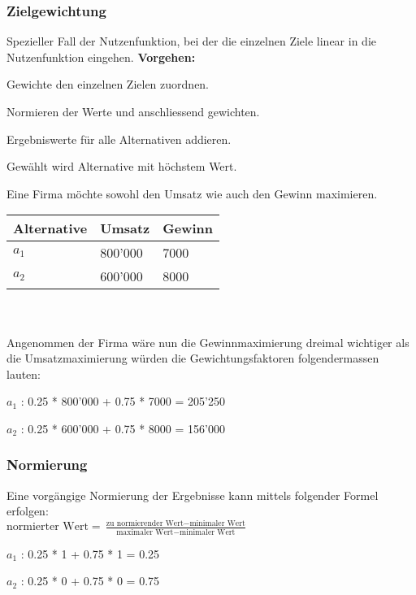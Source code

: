 \subsubsection{Zielgewichtung}
Spezieller Fall der Nutzenfunktion, bei der die einzelnen Ziele linear in die Nutzenfunktion eingehen.
\textbf{Vorgehen:} 
\begin{compactenum}
	\item Gewichte den einzelnen Zielen zuordnen.
	\item Normieren der Werte und anschliessend gewichten.
	\item Ergebniswerte für alle Alternativen addieren.
	\item Gewählt wird Alternative mit höchstem Wert.
\end{compactenum}
\begin{example}
	Eine Firma möchte sowohl den Umsatz	wie auch den Gewinn maximieren. \\
	\begin{tabular}{|l|l|l|}
		\hline
		\textbf{Alternative} & \textbf{Umsatz} & \textbf{Gewinn} \\ \hline
		$a_1$ & 800'000 & 7000 \\ \hline
		$a_2$ & 600'000 & 8000 \\ \hline		
	\end{tabular} \\ \ \\
	Angenommen der Firma wäre nun die Gewinnmaximierung dreimal wichtiger als die Umsatzmaximierung würden die Gewichtungsfaktoren folgendermassen lauten: 
	\begin{compactitem}
		\item $a_1$ : 0.25 * 800'000 + 0.75 * 7000 = 205'250
		\item $a_2$ : 0.25 * 600'000 + 0.75 * 8000 = 156'000
	\end{compactitem}
\end{example}

\subsubsection{Normierung}
Eine vorgängige Normierung der Ergebnisse kann mittels folgender Formel erfolgen: \\
$\text{normierter Wert} = \frac{\text{zu normierender Wert} - \text{minimaler Wert}}{\text{maximaler Wert} - \text{minimaler Wert}}$
\begin{example}
	\begin{compactitem}
		\item $a_1$ : 0.25 * 1 + 0.75 * 1 = 0.25
		\item $a_2$ : 0.25 * 0 + 0.75 * 0 = 0.75
	\end{compactitem}
\end{example}


